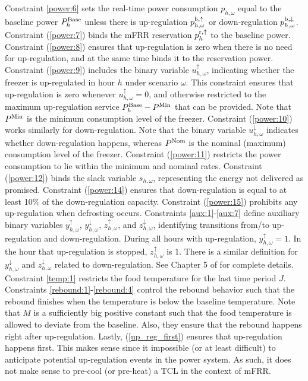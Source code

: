 {%
Constraint \eqref{power:6} sets the real-time power consumption $p_{h,\omega}$ equal to the baseline power $P^{\rm{Base}}_{h}$ unless there is up-regulation $p^{\rm{b}, \uparrow}_{h,\omega}$ or down-regulation $p^{\rm{b}, \downarrow}_{h,\omega}$. 
%
Constraint (\ref{power:7}) binds the mFRR reservation $p_{h}^{\rm{r},\uparrow}$ to the baseline power. 
%
Constraint (\ref{power:8}) ensures that up-regulation is zero when there is no need for up-regulation, and at the same time binds it to the reservation power. 
%
Constraint (\ref{power:9}) includes the binary variable $u^{\uparrow}_{h,\omega}$, indicating whether the freezer is up-regulated in hour $h$ under scenario $\omega$. This constraint ensures that up-regulation is zero whenever $u^{\uparrow}_{h,\omega} = 0$, and otherwise restricted to the maximum up-regulation service $P^{\rm{Base}}_{h}-P^{\rm{Min}}$ that can be provided. Note that $P^{\rm{Min}}$ is the minimum consumption level of the freezer. 
%
Constraint (\ref{power:10}) works similarly for down-regulation. Note that the binary variable $u^{\downarrow}_{h,\omega}$ indicates whether down-regulation happens, whereas $P^{\rm{Nom}}$ is the nominal (maximum) consumption level of the freezer. 
%
Constraint (\ref{power:11}) restricts the power consumption to lie within the minimum and nominal rates.
%
Constraint (\ref{power:12}) binds the slack variable $s_{h,\omega}$, representing the energy not delivered as promised. 
%
Constraint (\ref{power:14}) ensures that down-regulation is equal to at least 10\% of the down-regulation capacity. 
%
Constraint (\ref{power:15}) prohibits any up-regulation when defrosting occurs.
%
Constraints \eqref{aux:1}-\eqref{aux:7} define auxiliary binary variables $y^{\uparrow}_{h,\omega}$, $y^{\downarrow}_{h,\omega}$, $z^{\uparrow}_{h,\omega}$, and $z^{\downarrow}_{h,\omega}$, identifying transitions from/to up-regulation and down-regulation.
During all hours with up-regulation, $y^{\uparrow}_{h,\omega}=1$. In the hour that up-regulation is stopped, $z^{\uparrow}_{h,\omega}$ is 1. There is a similar definition for $y^{\downarrow}_{h,\omega}$ and $z^{\downarrow}_{h,\omega}$ related to down-regulation. 
See Chapter 5 of  \cite{morales2013integrating} for complete details.
%
Constraint \eqref{temp:1} restricts the food temperature for the last time period $J$.  
%
Constraints \eqref{rebound:1}-\eqref{rebound:4} control the rebound behavior such that the rebound finishes when the temperature is below the baseline temperature. Note that $M$ is a sufficiently big positive constant such that the food temperature is allowed to deviate from the baseline. Also, they ensure that the rebound happens right after up-regulation.
%
Lastly, (\ref{up_reg_first}) ensures that up-regulation happens first. This makes sense since it impossible (or at least difficult) to anticipate potential up-regulation events in the power system. As such, it does not make sense to pre-cool (or pre-heat) a TCL in the context of mFRR.

}
